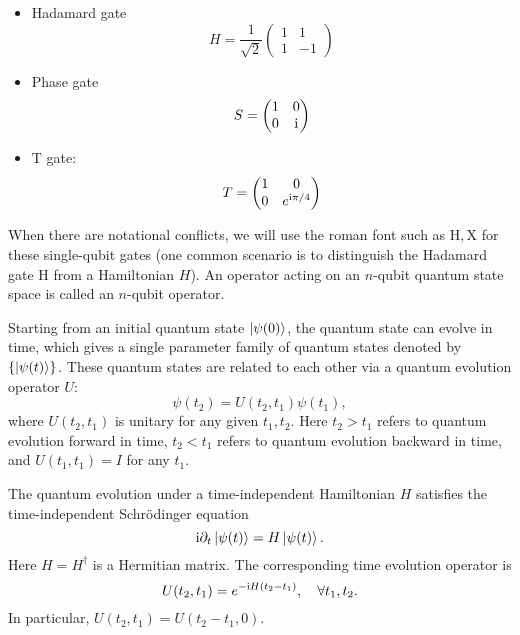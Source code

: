\begin{itemize}

\item Hadamard gate
\begin{equation}
H=\frac{1}{\sqrt{2}}\begin{pmatrix}
1 & 1\\
1 & -1
\end{pmatrix}
\end{equation}

\item Phase gate
\begin{equation}
S=\begin{pmatrix}
1 & 0\\
0 & \mathrm{i}
\end{pmatrix}
\end{equation}

\item $\mathrm{T}$ gate:
\begin{equation}
T=\begin{pmatrix}
1 & 0\\
0 & e^{\mathrm{i}\pi/4}
\end{pmatrix}
\end{equation}
\end{itemize}
When there are notational conflicts, we will use the roman font such as $\mathrm{H},\mathrm{X}$ for these single-qubit gates (one common scenario is to distinguish the Hadamard gate $\mathrm{H}$ from a Hamiltonian $H$). An operator acting on an $n$-qubit quantum state space is  called an $n$-qubit operator.

Starting from an initial quantum state $\ket{\psi(0)}$, the quantum state can evolve in time, which gives a single parameter family of quantum states denoted by $\{\ket{\psi(t)}\}$. These quantum states are related to each other via a quantum evolution operator $U$:
\begin{equation}
\psi(t_2)=U(t_2,t_1)\psi(t_1),
\end{equation}
where $U(t_2,t_1)$ is unitary for any given $t_1,t_2$. Here $t_2>t_1$ refers to quantum evolution forward in time, $t_2<t_1$ refers to quantum evolution backward in time, and $U(t_1,t_1)=I$ for any $t_1$. 

The quantum evolution under a time-independent Hamiltonian $H$ satisfies the time-independent Schr\"odinger equation
\begin{equation}
\mathrm{i} \partial_t\ket{\psi(t)}=H\ket{\psi(t)}.
\end{equation}
Here $H=H^{\dag}$ is a Hermitian matrix. The corresponding time evolution operator is
\begin{equation}
U(t_2,t_1)=e^{-\mathrm{i} H(t_2-t_1)}, \quad \forall t_1,t_2.
\end{equation}
In particular, $U(t_2,t_1)=U(t_2-t_1,0)$. 

